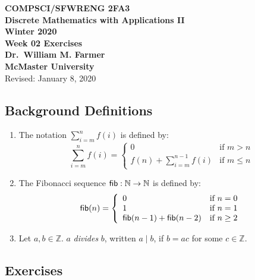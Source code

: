 \documentclass[11pt,fleqn]{article}
\newcommand{\bc}{\begin{center}}
\newcommand{\ec}{\end{center}}
\newcommand{\mname}[1]{\mbox{\sf #1}}
\begin{document}

\bc

  {\large \textbf{COMPSCI/SFWRENG 2FA3}}\\[2mm]
  {\large \textbf{Discrete Mathematics with Applications II}}\\[2mm]
  {\large \textbf{Winter 2020}}\\[8mm]
  {\huge \textbf{Week 02 Exercises}}\\[6mm]
  {\large \textbf{Dr.~William M. Farmer}}\\[2mm]
  {\large \textbf{McMaster University}}\\[6mm]
  {\large Revised: January 8, 2020}

\ec

\medskip

\subsection*{Background Definitions}

\begin{enumerate}

  \item The notation $\sum^{n}_{i=m}f(i)$ is defined by: 
    \[\sum^{n}_{i=m}f(i) =
      \left\{\begin{array}{ll}
               0                          & \textrm{if } m > n\\
               f(n) + \sum^{n-1}_{i=m}f(i) & \textrm{if } m \le n
             \end{array}
      \right.\] 

  \item The Fibonacci sequence $\mname{fib} : \mathbb{N} \rightarrow
    \mathbb{N}$ is defined by:
    \[\mname{fib}(n) = 
      \left\{\begin{array}{ll}
               0 & \textrm{if } n = 0 \\
               1 & \textrm{if } n = 1 \\
               \mname{fib}(n-1) + \mname{fib}(n-2) & \textrm{if } n \ge 2
             \end{array}
      \right.\]

   \item Let $a,b \in \mathbb{Z}$.  $a$ \emph{divides} $b$, written $a
     \mid b$, if $b = ac$ for some $c \in \mathbb{Z}$.

\end{enumerate}

\subsection*{Exercises}
\end{document}

